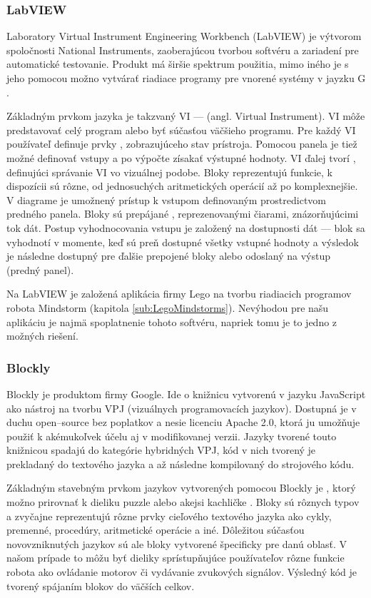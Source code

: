 \subsubsection{LabVIEW}
Laboratory Virtual Instrument Engineering Workbench (LabVIEW) je výtvorom spoločnosti National Instruments, zaoberajúcou tvorbou softvéru a zariadení pre automatické testovanie. Produkt má širšie spektrum použitia, mimo iného je s jeho pomocou možno vytvárať riadiace programy pre vnorené systémy v jayzku G \cite{LabVIEW}.

Základným prvkom jazyka je takzvaný VI ---  (angl. Virtual Instrument). VI môže predstavovať celý program alebo byť súčasťou väčšieho programu. Pre každý VI používateľ definuje prvky , zobrazujúceho stav prístroja. Pomocou panela je tiež možné definovať vstupy a po výpočte zísakať výstupné hodnoty. VI ďalej tvorí , definujúci správanie VI vo vizuálnej podobe. Bloky reprezentujú funkcie, k dispozícii sú rôzne, od jednosuchých aritmetických operácií až po komplexnejšie. V diagrame je umožnený prístup k vstupom definovaným prostredictvom predného panela. Bloky sú prepájané , reprezenovanými čiarami, znázorňujúcimi tok dát. Postup vyhodnocovania vstupu je založený na dostupnosti dát --- blok sa vyhodnotí v momente, keď sú preň dostupné všetky vstupné hodnoty a výsledok je následne dostupný pre ďalšie prepojené bloky alebo odoslaný na výstup (predný panel).

Na LabVIEW je založená aplikácia firmy Lego na tvorbu riadiacich programov robota Mindstorm (kapitola \ref{sub:LegoMindstorms}). Nevýhodou pre našu aplikáciu je najmä spoplatnenie tohoto softvéru, napriek tomu je to jedno z možných riešení.

\subsubsection{Blockly}
Blockly je produktom firmy Google. Ide o knižnicu vytvorenú v jazyku JavaScript ako nástroj na tvorbu VPJ (vizuálnych programovacích jazykov). Dostupná je v duchu open--source bez poplatkov a nesie licenciu Apache 2.0, ktorá ju umožňuje použiť k akémukoľvek účelu aj v modifikovanej verzii. Jazyky tvorené touto knižnicou spadajú do kategórie hybridných VPJ, kód v nich tvorený je prekladaný do textového jazyka a až následne kompilovaný do strojového kódu.

Základným stavebným prvkom jazykov vytvorených pomocou Blockly je , ktorý možno prirovnať k dieliku puzzle alebo akejsi kachličke \cite{pasternak2017tips}. Bloky sú rôznych typov a zvyčajne reprezentujú rôzne prvky cieľového textového jazyka ako cykly, premenné, procedúry, aritmetické operácie a iné. Dôležitou súčasťou novovzniknutých jazykov sú ale bloky vytvorené špecificky pre danú oblasť. V našom prípade to môžu byť dieliky sprístupňujúce používateľov rôzne funkcie robota ako ovládanie motorov či vydávanie zvukových signálov. Výsledný kód je tvorený spájaním blokov do väčších celkov.

